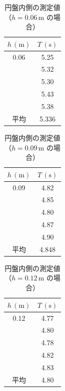 \documentclass{jlreq}
\begin{document}
\begin{table}[htbp]
  \centering
  \caption{円盤内側の測定値（$h=0.06\,\mathrm{m}$ の場合）}
  \renewcommand{\arraystretch}{1.2} %
  \setlength{\tabcolsep}{6pt}       %
  \begin{tabular}{|c|c|}
    \hline
    \textbf{$h\,(\mathrm{m})$} & \textbf{$T\,(\mathrm{s})$} \\ \hline
    0.06 & 5.25 \\ \hline
         & 5.32 \\ \hline
         & 5.30 \\ \hline
         & 5.43 \\ \hline
         & 5.38 \\ \hline
    平均 & 5.336 \\ \hline
  \end{tabular}
  \label{tab:disk_inner_0.06}
\end{table}



\begin{table}[htbp]
  \centering
  \caption{円盤内側の測定値（$h=0.09\,\mathrm{m}$ の場合）}
  \renewcommand{\arraystretch}{1.2} %
  \setlength{\tabcolsep}{6pt}       %
  \begin{tabular}{|c|c|}
    \hline
    \textbf{$h\,(\mathrm{m})$} & \textbf{$T\,(\mathrm{s})$} \\ \hline
    0.09 & 4.82 \\ \hline
         & 4.85 \\ \hline
         & 4.80 \\ \hline
         & 4.87 \\ \hline
         & 4.90 \\ \hline
    平均 & 4.848 \\ \hline
  \end{tabular}
  \label{tab:disk_inner_0.09}
\end{table}


\begin{table}[htbp]
  \centering
  \caption{円盤内側の測定値（$h=0.12\,\mathrm{m}$ の場合）}
  \renewcommand{\arraystretch}{1.2} %
  \setlength{\tabcolsep}{6pt}       %
  \begin{tabular}{|c|c|}
    \hline
    \textbf{$h\,(\mathrm{m})$} & \textbf{$T\,(\mathrm{s})$} \\ \hline
    0.12 & 4.77 \\ \hline
         & 4.80 \\ \hline
         & 4.78 \\ \hline
         & 4.82 \\ \hline
         & 4.83 \\ \hline
    平均 & 4.80 \\ \hline
  \end{tabular}
  \label{tab:disk_inner_0.12}
\end{table}
\end{document}
